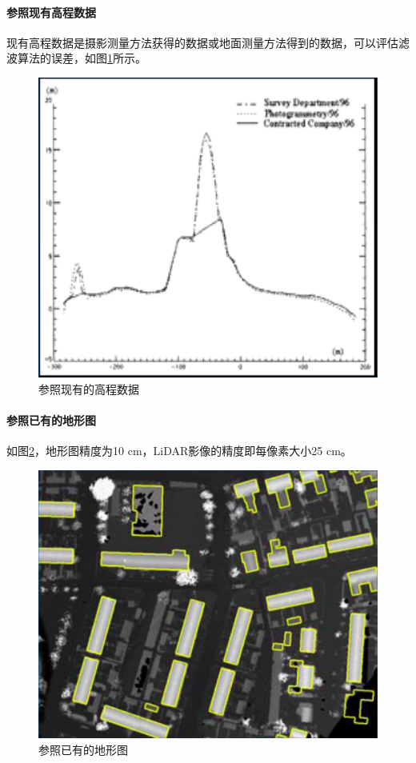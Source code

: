 \paragraph{参照现有高程数据}现有高程数据是摄影测量方法获得的数据或地面测量方法得到的数据，可以评估滤波算法的误差，如图\ref{fig:参照现有的高程数据}所示。
\begin{figure}[htbp]
	\centering
	\includegraphics[width=0.5\linewidth]{figure/Chapter8/参照现有的高程数据}
	\caption{参照现有的高程数据}
	\label{fig:参照现有的高程数据}
\end{figure}

\paragraph{参照已有的地形图}如图\ref{fig:参照已有的地形图}，地形图精度为10 cm，LiDAR影像的精度即每像素大小25 cm。
\begin{figure}[htbp]
	\centering
	\includegraphics[width=0.6\linewidth]{figure/Chapter8/参照已有的地形图}
	\caption{参照已有的地形图}
	\label{fig:参照已有的地形图}
\end{figure}
